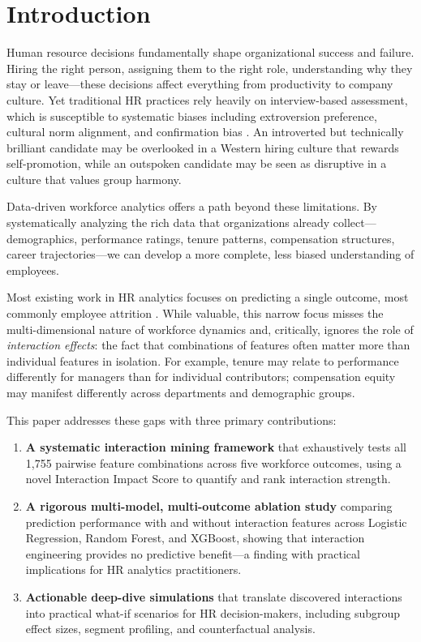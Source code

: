 \documentclass[twocolumn]{article}
\begin{document}
\section{Introduction}
\label{sec:introduction}

Human resource decisions fundamentally shape organizational success and failure. Hiring the right person, assigning them to the right role, understanding why they stay or leave---these decisions affect everything from productivity to company culture. Yet traditional HR practices rely heavily on interview-based assessment, which is susceptible to systematic biases including extroversion preference, cultural norm alignment, and confirmation bias \cite{fabris2025fairness}. An introverted but technically brilliant candidate may be overlooked in a Western hiring culture that rewards self-promotion, while an outspoken candidate may be seen as disruptive in a culture that values group harmony.

Data-driven workforce analytics offers a path beyond these limitations. By systematically analyzing the rich data that organizations already collect---demographics, performance ratings, tenure patterns, compensation structures, career trajectories---we can develop a more complete, less biased understanding of employees.

Most existing work in HR analytics focuses on predicting a single outcome, most commonly employee attrition \cite{talebi2025systematic}. While valuable, this narrow focus misses the multi-dimensional nature of workforce dynamics and, critically, ignores the role of \textit{interaction effects}: the fact that combinations of features often matter more than individual features in isolation. For example, tenure may relate to performance differently for managers than for individual contributors; compensation equity may manifest differently across departments and demographic groups.

This paper addresses these gaps with three primary contributions:

\begin{enumerate}
    \item \textbf{A systematic interaction mining framework} that exhaustively tests all 1,755 pairwise feature combinations across five workforce outcomes, using a novel Interaction Impact Score to quantify and rank interaction strength.
    \item \textbf{A rigorous multi-model, multi-outcome ablation study} comparing prediction performance with and without interaction features across Logistic Regression, Random Forest, and XGBoost, showing that interaction engineering provides no predictive benefit---a finding with practical implications for HR analytics practitioners.
    \item \textbf{Actionable deep-dive simulations} that translate discovered interactions into practical what-if scenarios for HR decision-makers, including subgroup effect sizes, segment profiling, and counterfactual analysis.
\end{enumerate}
\end{document}
